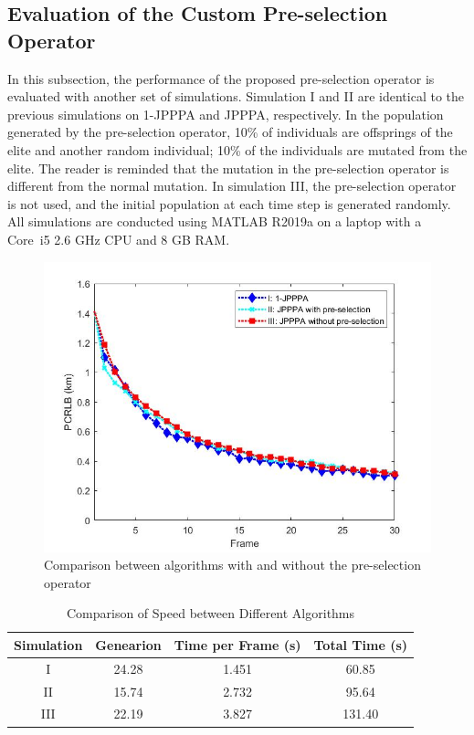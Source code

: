 \documentclass[12pt,journal,draftclsnofoot,onecolumn]{IEEEtran}
\begin{document}
\subsection{Evaluation of the Custom Pre-selection Operator}
In this subsection, the performance of the proposed pre-selection operator is evaluated with another set of simulations. Simulation I and II are identical to the previous simulations on 1-JPPPA and JPPPA, respectively. In the population generated by the pre-selection operator, 10\% of individuals are offsprings of the elite and another random individual; 10\% of the individuals are mutated from the elite. The reader is reminded that the mutation in the pre-selection operator is different from the normal mutation. In simulation III, the pre-selection operator is not used, and the initial population at each time step is generated randomly. All simulations are conducted using MATLAB R2019a on a laptop with a Core\texttrademark\ i5 2.6 GHz CPU and 8 GB RAM.

\begin{figure}
	\centering
	\includegraphics[scale=0.36]{Pre Selection.jpg}
	\caption{Comparison between algorithms with and without the pre-selection operator}
	\label{fig:Pre-selection}
\end{figure}


 \begin{table}
	\centering
	\caption{Comparison of Speed between Different Algorithms}
	\begin{tabular}{cccc}
		\toprule
		Simulation & Genearion & Time per Frame (s) & Total Time (s)\\ 
		\midrule
		I & 24.28 & 1.451 & 60.85\\ 
		II & 15.74 & 2.732 & 95.64\\ 
		III & 22.19 & 3.827 & 131.40\\ 
		\bottomrule
	\end{tabular}
	\label{tab:Pre-selection}
\end{table}
\end{document}
